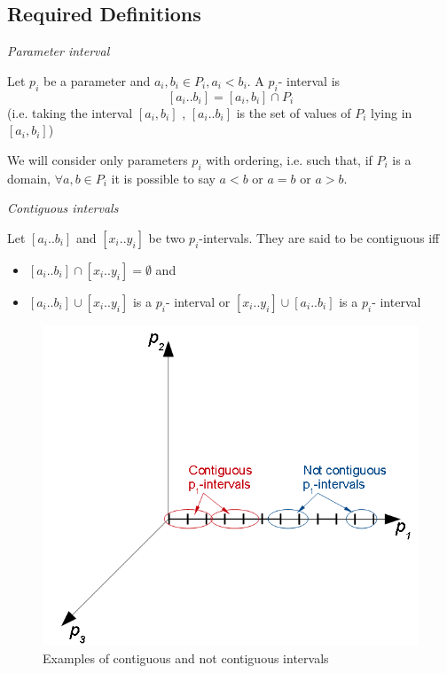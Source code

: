 \subsection{Required Definitions}
\begin{defn}
\emph{Parameter interval}

Let $p_{i}$ be a parameter and $a_{i},b_{i}\in P_{i},a_{i}<b_{i}$.
A $p_{i}$- interval is
\[
\left[a_{i}..b_{i}\right]=\left[a_{i},b_{i}\right]\cap P_{i}
\]
 (i.e. taking the interval $\left[a_{i},b_{i}\right]$ , $\left[a_{i}..b_{i}\right]$
is the set of values of $P_{i}$ lying in $\left[a_{i},b_{i}\right]$)
\end{defn}

\begin{rem}
We will consider only parameters $p_{i}$ with ordering, i.e. such
that, if $P_{i}$ is a domain, $\forall a,b\in P_{i}$ it is possible
to say $a<b$ or $a=b$ or $a>b$.
\end{rem}
\begin{defn}
\emph{\label{pers02.def:Contiguous-intervals}Contiguous intervals}

Let $\left[a_{i}..b_{i}\right]$ and $\left[x_{i}..y_{i}\right]$
be two $p_{i}$-intervals. They are said to be contiguous iff
\begin{itemize}
\item $\left[a_{i}..b_{i}\right]\cap\left[x_{i}..y_{i}\right]=\emptyset$
and
\item $\left[a_{i}..b_{i}\right]\cup\left[x_{i}..y_{i}\right]$ is a $p_{i}$-
interval or $\left[x_{i}..y_{i}\right]\cup\left[a_{i}..b_{i}\right]$
is a $p_{i}$- interval
\end{itemize}
\end{defn}
\begin{figure}[h]
\includegraphics[width=0.9\columnwidth]{img/contiguous_intervals_or_not}

\caption{Examples of contiguous and not contiguous intervals}

\end{figure}

